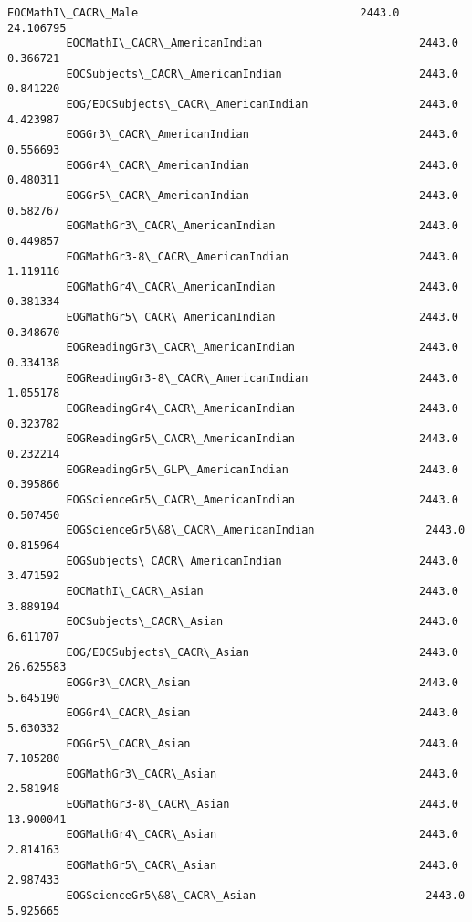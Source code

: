 \documentclass[11pt]{article}
\begin{document}
\begin{Verbatim}[commandchars=\\\{\}]
         EOCMathI\_CACR\_Male                                  2443.0      24.106795   
         EOCMathI\_CACR\_AmericanIndian                        2443.0       0.366721   
         EOCSubjects\_CACR\_AmericanIndian                     2443.0       0.841220   
         EOG/EOCSubjects\_CACR\_AmericanIndian                 2443.0       4.423987   
         EOGGr3\_CACR\_AmericanIndian                          2443.0       0.556693   
         EOGGr4\_CACR\_AmericanIndian                          2443.0       0.480311   
         EOGGr5\_CACR\_AmericanIndian                          2443.0       0.582767   
         EOGMathGr3\_CACR\_AmericanIndian                      2443.0       0.449857   
         EOGMathGr3-8\_CACR\_AmericanIndian                    2443.0       1.119116   
         EOGMathGr4\_CACR\_AmericanIndian                      2443.0       0.381334   
         EOGMathGr5\_CACR\_AmericanIndian                      2443.0       0.348670   
         EOGReadingGr3\_CACR\_AmericanIndian                   2443.0       0.334138   
         EOGReadingGr3-8\_CACR\_AmericanIndian                 2443.0       1.055178   
         EOGReadingGr4\_CACR\_AmericanIndian                   2443.0       0.323782   
         EOGReadingGr5\_CACR\_AmericanIndian                   2443.0       0.232214   
         EOGReadingGr5\_GLP\_AmericanIndian                    2443.0       0.395866   
         EOGScienceGr5\_CACR\_AmericanIndian                   2443.0       0.507450   
         EOGScienceGr5\&8\_CACR\_AmericanIndian                 2443.0       0.815964   
         EOGSubjects\_CACR\_AmericanIndian                     2443.0       3.471592   
         EOCMathI\_CACR\_Asian                                 2443.0       3.889194   
         EOCSubjects\_CACR\_Asian                              2443.0       6.611707   
         EOG/EOCSubjects\_CACR\_Asian                          2443.0      26.625583   
         EOGGr3\_CACR\_Asian                                   2443.0       5.645190   
         EOGGr4\_CACR\_Asian                                   2443.0       5.630332   
         EOGGr5\_CACR\_Asian                                   2443.0       7.105280   
         EOGMathGr3\_CACR\_Asian                               2443.0       2.581948   
         EOGMathGr3-8\_CACR\_Asian                             2443.0      13.900041   
         EOGMathGr4\_CACR\_Asian                               2443.0       2.814163   
         EOGMathGr5\_CACR\_Asian                               2443.0       2.987433   
         EOGScienceGr5\&8\_CACR\_Asian                          2443.0       5.925665   

\end{Verbatim}
\end{document}
